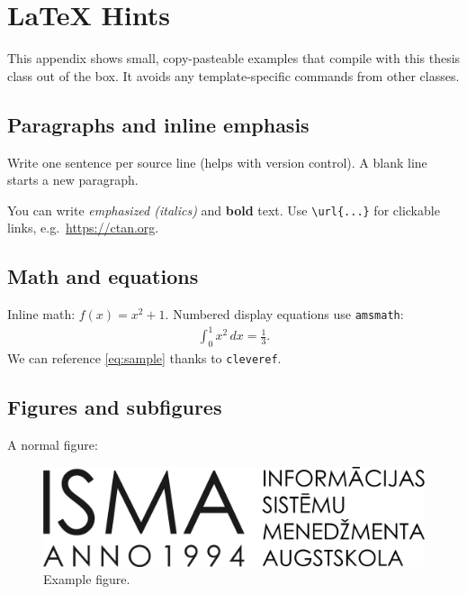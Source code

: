 \chapter{LaTeX Hints}
\label{chap:latexhints}


\newenvironment{twocoldemo}[1][]{%
  \par\noindent
  \begin{minipage}[t]{.48\linewidth}\raggedright
  \textbf{Code}\par\smallskip
}{%
  \end{minipage}\hfill
  \begin{minipage}[t]{.48\linewidth}\raggedright
  \textbf{Output}\par\smallskip
  \end{minipage}\par
}



This appendix shows small, copy-pasteable examples that compile with this thesis class out of the box. It avoids any template-specific commands from other classes.

\section{Paragraphs and inline emphasis}
Write one sentence per source line (helps with version control). A blank line starts a new paragraph.

You can write \emph{emphasized (italics)} and \textbf{bold} text. Use \verb|\url{...}| for clickable links, e.g.\ \url{https://ctan.org}.

\section{Math and equations}
Inline math: $f(x)=x^2+1$. Numbered display equations use \texttt{amsmath}:
\begin{align}
  \label{eq:sample}
  \int_0^1 x^2\,dx = \frac{1}{3}.
\end{align}
We can reference \cref{eq:sample} thanks to \texttt{cleveref}.

\section{Figures and subfigures}
A normal figure:
\begin{figure}[h]
  \centering
  \includegraphics[width=.7\linewidth]{b_chapters/chapter1/assets/isma_logo.png}
  \caption{Example figure.}
  \label{fig:example}
\end{figure}

